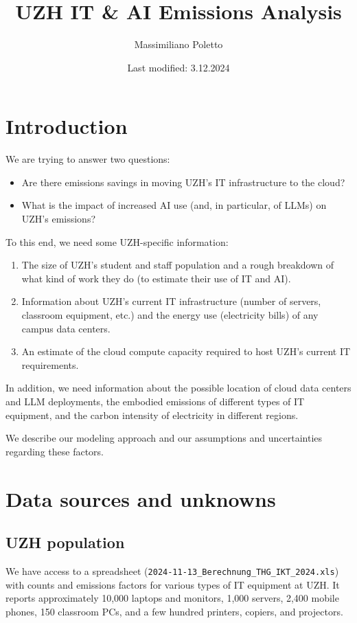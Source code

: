 \documentclass[11pt]{article}
\title{UZH IT \& AI Emissions Analysis\vspace{-1em}}
\author{Massimiliano Poletto}
\date{\vspace{-1em}Last modified: 3.12.2024}
\begin{document}
\maketitle
\section{Introduction}

We are trying to answer two questions:
\begin{itemize}
    \item Are there emissions savings in moving UZH's IT infrastructure to the cloud?
    \item What is the impact of increased AI use (and, in particular, of LLMs) on UZH's emissions?
\end{itemize}

To this end, we need some UZH-specific information:
\begin{enumerate}
    \item The size of UZH's student and staff population and a rough breakdown of
        what kind of work they do (to estimate their use of IT and AI).
    \item Information about UZH's current IT infrastructure (number of servers,
        classroom equipment, etc.) and the energy use (electricity bills) of any
        campus data centers.
    \item An estimate of the cloud compute capacity required to host UZH's current IT requirements.
\end{enumerate}

In addition, we need information about the possible location of cloud data centers and
LLM deployments, the embodied emissions of different types of IT equipment, and the carbon intensity
of electricity in different regions.

We describe our modeling approach and our assumptions and uncertainties regarding these factors.

\section{Data sources and unknowns}

\subsection{UZH population}

We have access to a spreadsheet (\texttt{2024-11-13\_Berechnung\_THG\_IKT\_2024.xls}) with
counts and emissions factors for various types of IT equipment at UZH. It reports approximately
10,000 laptops and monitors, 1,000 servers, 2,400 mobile phones,  150 classroom PCs, and a few
hundred printers, copiers, and projectors.
\end{document}
